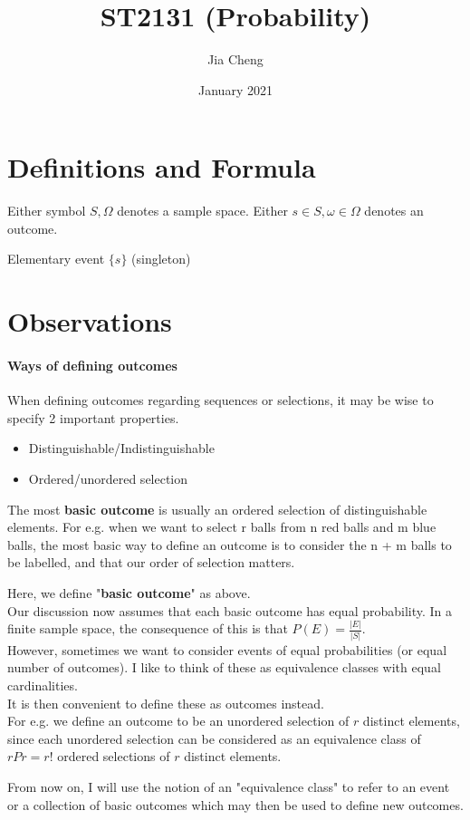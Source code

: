 \documentclass{article}
\title{ST2131 (Probability)}
\author{Jia Cheng}
\date{January 2021}
\begin{document}
\maketitle

\section{Definitions and Formula}
Either symbol $S, \Omega$ denotes a sample space.
Either $s\in S, \omega\in \Omega$ denotes an outcome.

Elementary event $\{s\}$ (singleton)

\section{Observations}
\paragraph{Ways of defining outcomes}
When defining outcomes regarding sequences or selections, it may be wise to specify 2 important properties.
\begin{itemize}
	\item Distinguishable/Indistinguishable
	\item Ordered/unordered selection
\end{itemize}
The most \textbf{basic outcome} is usually an ordered selection of distinguishable elements. For e.g. when we want to select r balls from n red balls and m blue balls, the most basic way to define an outcome is to consider the n + m balls to be labelled, and that our order of selection matters.

Here, we define "\textbf{basic outcome}" as above.\\
Our discussion now assumes that each basic outcome has equal probability. In a finite sample space, the consequence of this is that $P(E)=\frac{|E|}{|S|}$.\\
However, sometimes we want to consider events of equal probabilities (or equal number of outcomes). I like to think of these as equivalence classes with equal cardinalities.\\
It is then convenient to define these as outcomes instead.\\
For e.g. we define an outcome to be an unordered selection of $r$ distinct elements, since each unordered selection can be considered as an equivalence class of $rPr=r!$ ordered selections of $r$ distinct elements.

From now on, I will use the notion of an "equivalence class" to refer to an event or a collection of basic outcomes which may then be used to define new outcomes.
\end{document}
